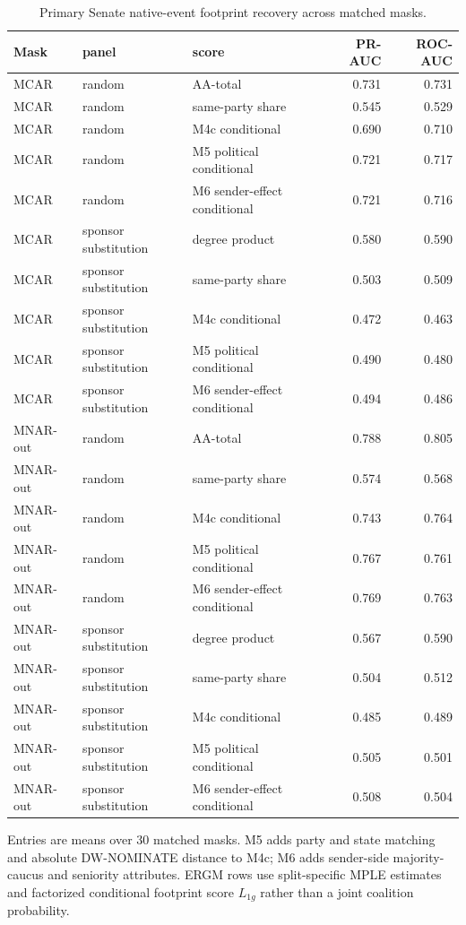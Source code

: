 \begin{table}[tbp]
\centering
\small
\caption{Primary Senate native-event footprint recovery across matched masks.}
\label{tab:senate-performance}
\begin{tabular}{lllrr}
\toprule
Mask & panel & score & PR-AUC & ROC-AUC \\
\midrule
MCAR & random & AA-total & 0.731 & 0.731 \\
MCAR & random & same-party share & 0.545 & 0.529 \\
MCAR & random & M4c conditional & 0.690 & 0.710 \\
MCAR & random & M5 political conditional & 0.721 & 0.717 \\
MCAR & random & M6 sender-effect conditional & 0.721 & 0.716 \\
MCAR & sponsor substitution & degree product & 0.580 & 0.590 \\
MCAR & sponsor substitution & same-party share & 0.503 & 0.509 \\
MCAR & sponsor substitution & M4c conditional & 0.472 & 0.463 \\
MCAR & sponsor substitution & M5 political conditional & 0.490 & 0.480 \\
MCAR & sponsor substitution & M6 sender-effect conditional & 0.494 & 0.486 \\
MNAR-out & random & AA-total & 0.788 & 0.805 \\
MNAR-out & random & same-party share & 0.574 & 0.568 \\
MNAR-out & random & M4c conditional & 0.743 & 0.764 \\
MNAR-out & random & M5 political conditional & 0.767 & 0.761 \\
MNAR-out & random & M6 sender-effect conditional & 0.769 & 0.763 \\
MNAR-out & sponsor substitution & degree product & 0.567 & 0.590 \\
MNAR-out & sponsor substitution & same-party share & 0.504 & 0.512 \\
MNAR-out & sponsor substitution & M4c conditional & 0.485 & 0.489 \\
MNAR-out & sponsor substitution & M5 political conditional & 0.505 & 0.501 \\
MNAR-out & sponsor substitution & M6 sender-effect conditional & 0.508 & 0.504 \\
\bottomrule
\end{tabular}
\par\vspace{2pt}\footnotesize Entries are means over 30 matched masks. M5 adds party and state matching and absolute DW-NOMINATE distance to M4c; M6 adds sender-side majority-caucus and seniority attributes. ERGM rows use split-specific MPLE estimates and factorized conditional footprint score $L_{1g}$ rather than a joint coalition probability.
\end{table}
